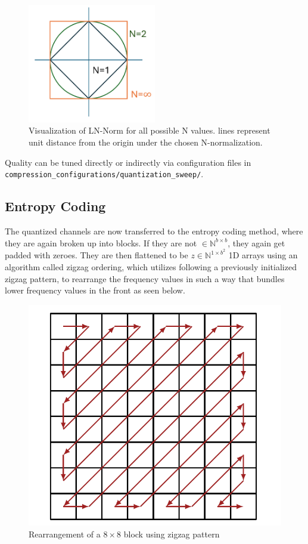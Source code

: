 \begin{figure}
	\includegraphics[width=0.5\textwidth]{assets/LN-Norm.png}
	\caption{Visualization of LN-Norm for all possible N values. lines represent unit distance from the origin under the chosen N-normalization.}
	\label{fig:LN-norm}
\end{figure}
Quality can be tuned directly or indirectly via configuration files in \texttt{compression\_configurations/\allowbreak quantization\_sweep/}.

\subsection{Entropy Coding}
The quantized channels are now transferred to the entropy coding method, where they are again broken up into blocks. If they are not \(\in \mathbb{N}^{b\times b}\), they again get padded with zeroes. They are then flattened to be \(z \in \mathbb{N}^{1\times b^2}\) 1D arrays using an algorithm called zigzag ordering, which utilizes following a previously initialized zigzag pattern, to rearrange the frequency values in such a way that bundles lower frequency values in the front as seen below.

\begin{figure}[H]
	\centering
	\includegraphics[width=0.8\linewidth]{assets/zigzag.png}
	\caption{Rearrangement of a \(8\times8\) block using zigzag pattern}
	\label{fig:zigzag}
\end{figure}

